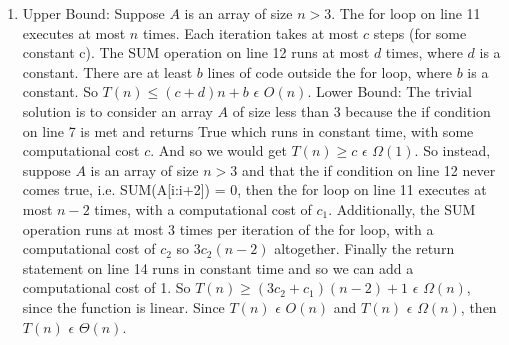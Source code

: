 \documentclass{article}
\begin{document}
\begin{enumerate}[label=(\alph*)]
    \item Upper Bound:
    \newline Suppose $A$ is an array of size $n > 3$. The for loop on line 11 executes at most $n$ times. Each iteration takes at most $c$ steps (for some constant c). The SUM operation on line 12 runs at most $d$ times, where $d$ is a constant. There are at least $b$ lines of code outside the for loop, where $b$ is a constant. So $T(n) \leq (c+d)n + b$ $\epsilon$ $O(n)$.
    \newline 
    \newline Lower Bound:
    \newline The trivial solution is to consider an array $A$ of size less than 3 because the if condition on line 7 is met and returns True which runs in constant time, with some computational cost $c$. And so we would get $T(n) \geq c$ $\epsilon$ $\Omega(1)$. So instead, suppose $A$ is an array of size $n > 3$ and that the if condition on line 12 never comes true, i.e. SUM(A[i:i+2]) = 0, then the for loop on line 11 executes at most $n-2$ times, with a computational cost of $c_1$. Additionally, the SUM operation runs at most 3 times per iteration of the for loop, with a computational cost of $c_2$ so $3c_2(n-2)$ altogether. Finally the return statement on line 14 runs in constant time and so we can add a computational cost of 1. So $T(n) \geq (3c_2+c_1)(n-2) + 1$ $\epsilon$ $\Omega(n)$, since the function is linear.
    \newline
    \newline Since $T(n)$ $\epsilon$ $O(n)$ and $T(n)$ $\epsilon$ $\Omega(n)$, then $T(n)$ $\epsilon$ $\Theta(n)$.
\end{enumerate}
\end{document}
